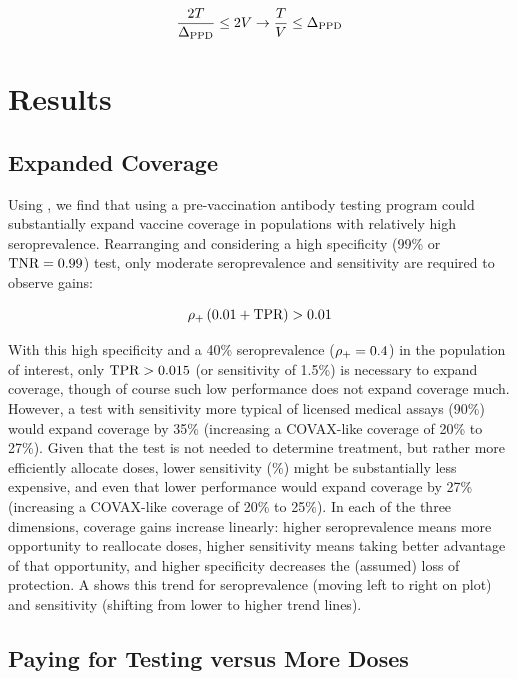 \documentclass[10pt,a4paper,twocolumn]{article}
\begin{document}
\begin{equation}\label{costlim}
\frac{2T}{\Delta_{\textrm{PPD}}} \le 2V \rightarrow \frac{T}{V} \le \Delta_{\textrm{PPD}}
\end{equation}

\section*{Results}

\subsection*{Expanded Coverage}

Using , we find that using a pre-vaccination antibody testing program could substantially expand vaccine coverage in populations with relatively high seroprevalence. Rearranging  and considering a high specificity (99\% or $\textrm{TNR}=0.99$) test, only moderate seroprevalence and sensitivity are required to observe gains: 

\begin{equation}\label{egppd}
\rho_{{+}} \left(0.01 + \textrm{TPR}\right) > 0.01
\end{equation}

With this high specificity and a 40\% seroprevalence \mbox{($\rho_{{+}}=0.4$)} in the population of interest, only $\textrm{TPR} > 0.015$ (or sensitivity of 1.5\%) is necessary to expand coverage, though of course such low performance does not expand coverage much. However, a test with sensitivity more typical of licensed medical assays (90\%) would expand coverage by 35\% (\eg* increasing a COVAX-like coverage of 20\% to 27\%). Given that the test is not needed to determine treatment, but rather more efficiently allocate doses, lower sensitivity (\%) might be substantially less expensive, and even that lower performance would expand coverage by 27\% (\eg* increasing a COVAX-like coverage of 20\% to 25\%). In each of the three dimensions, coverage gains increase linearly: higher seroprevalence means more opportunity to reallocate doses, higher sensitivity means taking better advantage of that opportunity, and higher specificity decreases the (assumed) loss of protection. A shows this trend for seroprevalence (moving left to right on plot) and sensitivity (shifting from lower to higher trend lines).

\subsection*{Paying for Testing versus More Doses}
\end{document}
